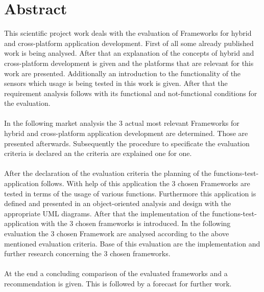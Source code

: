 \chapter*{Abstract}

This scientific project work deals with the evaluation of Frameworks for hybrid and cross-platform application development. First of all some already published work is being analysed. After that an explanation of the concepts of hybrid and cross-platform development is given and the platforms that are relevant for this work are presented. Additionally an introduction to the functionality of the sensors which usage is being tested in this work is given. After that the requirement analysis follows with its functional and not-functional conditions for the evaluation.
\\
\\
In the following market analysis the 3 actual most relevant Frameworks for hybrid and cross-platform application development are determined. Those are presented afterwards. Subsequently the procedure to specificate the evaluation criteria is declared an the criteria are explained one for one. 
\\
\\
After the declaration of the evaluation criteria the planning of the functions-test-application follows. With help of this application the 3 chosen Frameworks are tested in terms of the usage of various functions. Furthermore this application is defined and presented in an object-oriented analysis and design with the appropriate UML diagrams. After that the implementation of the functions-test-application with the 3 chosen frameworks is introduced. In the following evaluation the 3 chosen Framework are analysed according to the above mentioned evaluation criteria. Base of this evaluation are the implementation and further research concerning the 3 chosen frameworks. 
\\
\\
At the end a concluding comparison of the evaluated frameworks and a recommendation is given. This is followed by a forecast for further work. 